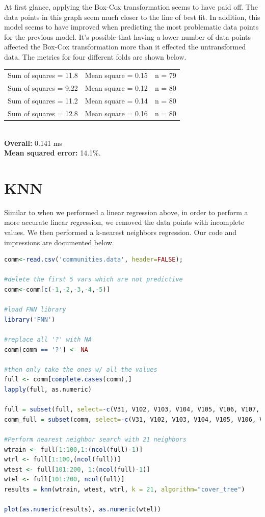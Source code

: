 \documentclass{article}
\begin{document}
At first glance, applying the Box-Cox transformation seems to have paid off. The
data points in this graph seem much closer to the line of best fit. In addition,
this model seems to have improved when predicting the most problematic data
points for the previous model. It's possible that having a lower number of data
points affected the Box-Cox transformation more than it effected the
untransformed data. The metrics for four different folds are shown below.\\ 

\noindent
\begin{tabular}{l c r}
  Sum of squares = 11.8 & Mean square = 0.15 & n = 79\\
  Sum of squares = 9.22 & Mean square = 0.12 & n = 80\\ 
  Sum of squares = 11.2 & Mean square = 0.14 & n = 80\\ 
  Sum of squares = 12.8 & Mean square = 0.16 & n = 80\\ 
\end{tabular}\\

\noindent
\textbf{Overall:} 0.141 ms \\
\textbf{Mean squared error:} 14.1\%.

\section{KNN}
Similar to when we performed a linear regression above, in order to perform a
more accurate linear regression, we removed the data points with incomplete
values. We then performed a k-nearest neighbors regression. Our code and
impressions are documented below.

\begin{lstlisting}[language=r]
comm<-read.csv('communities.data', header=FALSE);

#delete the first 5 vars which are not predictive
comm<-comm[c(-1,-2,-3,-4,-5)] 

#load FNN library
library('FNN')

#replace all '?' with NA
comm[comm == '?'] <- NA

#then only take the ones w/ all the values
full <- comm[complete.cases(comm),]
lapply(full, as.numeric)

full = subset(full, select=-c(V31, V102, V103, V104, V105, V106, V107, V108, V109, V111, V110, V112, V113, V114, V115, V116, V117, V118, V122, V123, V124, V125, V127))
comm_full = subset(comm, select=-c(V31, V102, V103, V104, V105, V106, V107, V108, V109, V111, V110, V112, V113, V114, V115, V116, V117, V118, V122, V123, V124, V125, V127))

#Perform nearest neighbor search with 21 neighbors
wtrain <- full[1:100,1:(ncol(full)-1)]
wtrl <- full[1:100,(ncol(full))]
wtest <- full[101:200, 1:(ncol(full)-1)]
wtel <- full[101:200, ncol(full)]
results = knn(wtrain, wtest, wtrl, k = 21, algorithm="cover_tree")

plot(as.numeric(results), as.numeric(wtel))
\end{lstlisting}
\end{document}
